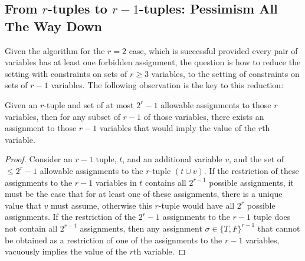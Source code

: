 \documentclass[final,12pt]{colt2018}
\begin{document}
\subsection{From $r$-tuples to $r-1$-tuples: Pessimism All The Way Down}\label{sec:intuitRed} 

Given the algorithm for the $r=2$ case, which is successful provided every pair of variables has at least one forbidden assignment, the question is how to reduce the setting with constraints on sets of $r \ge 3$ variables, to the setting of constraints on sets of $r-1$ variables.   The following observation is the key to this reduction:

\begin{lemma}\label{lemma:eitherway}
Given an $r$-tuple and set of at most $2^{r}-1$ allowable assignments to those $r$ variables, then for any subset of $r-1$ of those variables, there exists an assignment to those $r-1$ variables that would imply the value of the $r$th variable.  
\end{lemma}
\begin{proof}
Consider an $r-1$ tuple, $t$, and an additional variable $v$, and the set of $\le 2^{r}-1$ allowable assignments to the $r$-tuple $(t \cup v)$.  If the restriction of these assignments to the $r-1$ variables in $t$ contains all $2^{r-1}$ possible assignments, it must be the case that for at least one of these assignments, there is a unique value that $v$ must assume, otherwise this $r$-tuple would have all $2^r$ possible assignments.   If the restriction of the $2^r - 1$ assignments to the $r-1$ tuple does not contain all $2^{r-1}$ assignments, then any assignment $\sigma \in \{T,F\}^{r-1}$ that cannot be obtained as a restriction of one of the assignments to the $r-1$ variables, vacuously implies the value of the $r$th variable.
\end{proof}
\end{document}

